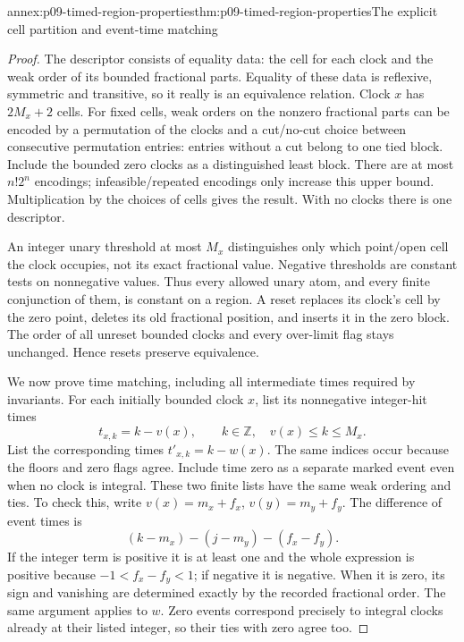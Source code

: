 \begin{annexitem}{annex:p09-timed-region-properties}{thm:p09-timed-region-properties}{The explicit cell partition and event-time matching}
\begin{proof}
The descriptor consists of equality data: the cell for each clock and the
weak order of its bounded fractional parts. Equality of these data is
reflexive, symmetric and transitive, so it really is an equivalence relation.
Clock \(x\) has \(2M_x+2\) cells. For fixed cells, weak orders on the
nonzero fractional parts can be encoded by a permutation of the clocks
and a cut/no-cut choice between consecutive permutation entries: entries
without a cut belong to one tied block. Include the bounded zero clocks
as a distinguished least block. There are at most \(n!2^n\) encodings;
infeasible/repeated encodings only increase this upper bound. Multiplication
by the choices of cells gives the result. With no clocks there is one
descriptor.

An integer unary threshold at most \(M_x\) distinguishes only which
point/open cell the clock occupies, not its exact fractional value.
Negative thresholds are constant tests on nonnegative values. Thus every
allowed unary atom, and every finite conjunction of them, is constant on
a region. A reset replaces its clock's cell by the zero point, deletes
its old fractional position, and inserts it in the zero block. The order
of all unreset bounded clocks and every over-limit flag stays unchanged.
Hence resets preserve equivalence.

We now prove time matching, including all intermediate times required by
invariants. For each initially bounded clock \(x\), list its nonnegative
integer-hit times
\[
 t_{x,k}=k-v(x),\qquad
 k\in\mathbb Z,\quad v(x)\leq k\leq M_x.
\]
List the corresponding times \(t'_{x,k}=k-w(x)\). The same indices occur
because the floors and zero flags agree. Include time zero as a separate
marked event even when no clock is integral. These two finite lists have
the same weak ordering and ties. To check this, write
\(v(x)=m_x+f_x\), \(v(y)=m_y+f_y\). The difference of event times is
\[
 (k-m_x)-(j-m_y)-(f_x-f_y).
\]
If the integer term is positive it is at least one and the whole expression
is positive because \(-1<f_x-f_y<1\); if negative it is negative.
When it is zero, its sign and vanishing are determined exactly by the
recorded fractional order. The same argument applies to \(w\).
Zero events correspond precisely to integral clocks already at their
listed integer, so their ties with zero agree too.


\end{proof}
\end{annexitem}
